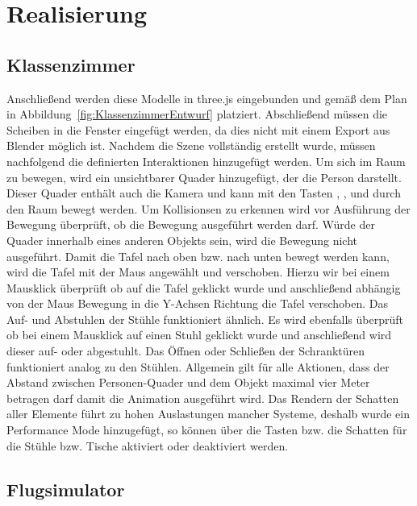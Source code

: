 \section{Realisierung}
\subsection{Klassenzimmer}
Anschließend werden diese Modelle in three.js eingebunden und gemäß dem Plan in Abbildung~\ref{fig:KlassenzimmerEntwurf}
platziert.
Abschließend müssen die Scheiben in die Fenster eingefügt werden, da dies nicht mit einem Export aus Blender möglich ist.
\newparagraph
Nachdem die Szene vollständig erstellt wurde, müssen nachfolgend die definierten Interaktionen hinzugefügt werden.
Um sich im Raum zu bewegen, wird ein unsichtbarer Quader hinzugefügt, der die Person darstellt. Dieser Quader enthält auch die Kamera
und kann mit den Tasten , ,  und  durch den Raum bewegt werden. Um Kollisionsen zu erkennen wird vor Ausführung der Bewegung überprüft,
ob die Bewegung ausgeführt werden darf. 
Würde der Quader innerhalb eines anderen Objekts sein, wird die Bewegung nicht ausgeführt.
\newparagraph
Damit die Tafel nach oben bzw. nach unten bewegt werden kann, wird die Tafel mit der Maus angewählt und verschoben.
Hierzu wir bei einem Mausklick überprüft ob auf die Tafel geklickt wurde und anschließend abhängig von der Maus Bewegung in die Y-Achsen Richtung die Tafel verschoben.
Das Auf- und Abstuhlen der Stühle funktioniert ähnlich. Es wird ebenfalls überprüft ob bei einem Mausklick auf einen Stuhl geklickt wurde und anschließend wird dieser auf- oder abgestuhlt.
Das Öffnen oder Schließen der Schranktüren funktioniert analog zu den Stühlen.
Allgemein gilt für alle Aktionen, dass der Abstand zwischen Personen-Quader und dem Objekt maximal vier Meter betragen darf damit die Animation ausgeführt wird.
\newparagraph
Das Rendern der Schatten aller Elemente führt zu hohen Auslastungen mancher Systeme, deshalb wurde ein Performance Mode hinzugefügt, so können über die Tasten  bzw. 
die Schatten für die Stühle bzw. Tische aktiviert oder deaktiviert werden.
\subsection{Flugsimulator}


